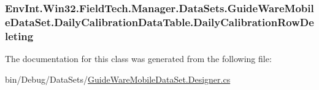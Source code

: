 \subsubsection[{Daily\+Calibration\+Row\+Deleting}]{ Env\+Int.\+Win32.\+Field\+Tech.\+Manager.\+Data\+Sets.\+Guide\+Ware\+Mobile\+Data\+Set.\+Daily\+Calibration\+Data\+Table.\+Daily\+Calibration\+Row\+Deleting}\label{class_env_int_1_1_win32_1_1_field_tech_1_1_manager_1_1_data_sets_1_1_guide_ware_mobile_data_set_5b380d875f3f569d74f6183f0c2ee8d7_ac89167abbab2ffaacb6854e36490d5b2}


The documentation for this class was generated from the following file\+:\begin{DoxyCompactItemize}
\item 
bin/\+Debug/\+Data\+Sets/\hyperlink{bin_2_debug_2_data_sets_2_guide_ware_mobile_data_set_8_designer_8cs}{Guide\+Ware\+Mobile\+Data\+Set.\+Designer.\+cs}\end{DoxyCompactItemize}

